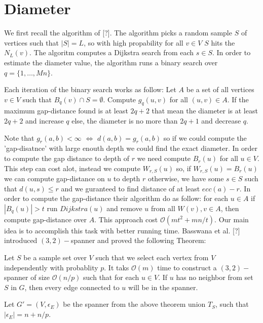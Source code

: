\section{Diameter}
We first recall the algorithm of [?]. 
The algorithm picks a random sample $S$ of vertices such that $|S|=L$, so with high propability for all $v \in V$ $S$ hits the $N_L(v)$. The algoritm computes a Dijkstra search from each $s \in S$. In order to estimate the diameter value, the algorithm runs a binary search over $q=\{1,\dots,Mn\}$. 
\begin{indentblock}
Each iteration of the binary search works as follow:
\newline Let $A$ be a set of all vertices $v \in V$ such that $B_q(v)\cap S = \emptyset$.
Compute $g_q(u,v)$ for all $(u,v) \in A$.
\newline If the maximum gap-distance found is at least $2q+2$ that mean the diameter is at least $2q+2$ and increase $q$ else, the diameter is no more than $2q+1$ and decrease $q$.
\end{indentblock}
\breakline
Note that $g_r(a,b) < \infty$ $\Leftrightarrow$ $d(a,b)=g_r(a,b)$ so if we could compute the 'gap-disatnce' with large enouth depth we could find the exact diameter. In order to compute the gap distance to depth of $r$ we need compute $B_r(u)$ for all $u\in V$. This step can cost alot, instead we compute $W_{r,S}(u)$ so, if $W_{r,S}(u)=B_r(u)$ we can compute gap-distance on $u$ to depth $r$ otherwise, we have some $s\in S$ such that $d(u,s)\leq r$ and we guranteed to find distance of at least $ecc(a)-r$.  
\breakline \breakline
In order to compute the gap-distance their algorithm do as follow:
for each $u\in A$ if $|B_q(u)|>t$ run $Dijkstra(u)$ and remove $u$ from all $W(v), v\in A$, then compute gap-distance over $A$. This approach cost $\mathcal{O}(mt^2+mn/t)$. Our main idea is to accomplish this task with better running time.
\breakline \breakline
Basswana et al. [?] introduced $(3,2)-$spanner and proved the following Theorem: 
\begin{theorem}
Let $S$ be a sample set over $V$ such that we select each vertex from $V$ independently with probablity $p$. It taks $\mathcal{O}(m)$ time to construct a $(3,2)-$spanner of size $\mathcal{O}(n/p)$ such that for each $u\in V$.
 If $u$ has no neighbor from set $S$ in $G$, then every edge connected to $u$ will be in the spanner. 
\end{theorem}

Let $G'=(V,\epsilon_E)$ be the spanner from the above theorem union $T_S$, such that $|\epsilon_E|=n+n/p$. %

